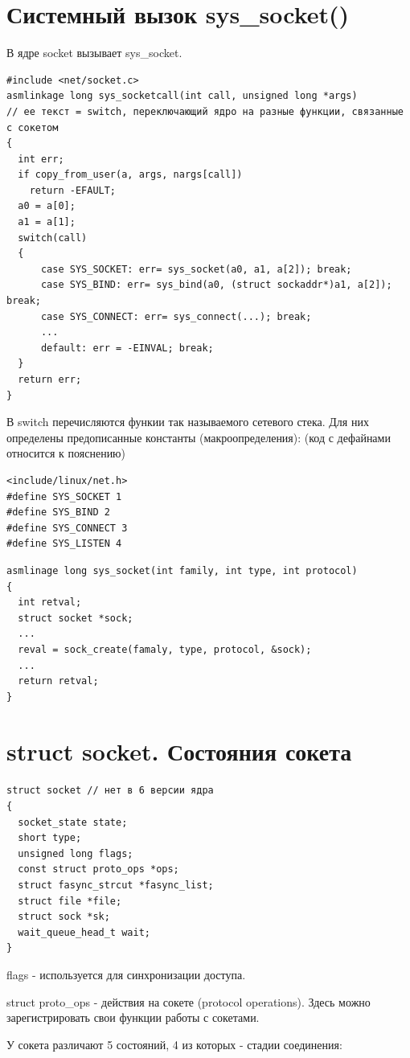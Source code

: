 \section{Системный вызок sys\_socket()}
В ядре socket вызывает sys\_socket.
\begin{lstlisting}
#include <net/socket.c>
asmlinkage long sys_socketcall(int call, unsigned long *args)
// ее текст = switch, переключающий ядро на разные функции, связанные с сокетом
{
  int err;
  if copy_from_user(a, args, nargs[call])
    return -EFAULT;
  a0 = a[0];
  a1 = a[1];
  switch(call)
  {
      case SYS_SOCKET: err= sys_socket(a0, a1, a[2]); break;
      case SYS_BIND: err= sys_bind(a0, (struct sockaddr*)a1, a[2]); break;
      case SYS_CONNECT: err= sys_connect(...); break;
      ...
      default: err = -EINVAL; break;
  }
  return err;
}
\end{lstlisting}
В switch перечисляются функии так называемого сетевого стека. Для них определены предописанные константы (макроопределения): (код с дефайнами относится к пояснению)

\begin{lstlisting}
<include/linux/net.h>
#define SYS_SOCKET 1
#define SYS_BIND 2
#define SYS_CONNECT 3
#define SYS_LISTEN 4
\end{lstlisting}

\begin{lstlisting}
asmlinage long sys_socket(int family, int type, int protocol)
{
  int retval;
  struct socket *sock;
  ...
  reval = sock_create(famaly, type, protocol, &sock);
  ...
  return retval;
}
\end{lstlisting}

\section{struct socket. Состояния сокета}
\begin{lstlisting}
struct socket // нет в 6 версии ядра
{
  socket_state state;
  short type;
  unsigned long flags;
  const struct proto_ops *ops;
  struct fasync_strcut *fasync_list;
  struct file *file;
  struct sock *sk;
  wait_queue_head_t wait;
}
\end{lstlisting}

flags - используется для синхронизации доступа.

struct proto\_ops - действия на сокете (protocol operations). Здесь можно зарегистрировать свои функции работы с сокетами.

У сокета различают 5 состояний, 4 из которых - стадии соединения:

